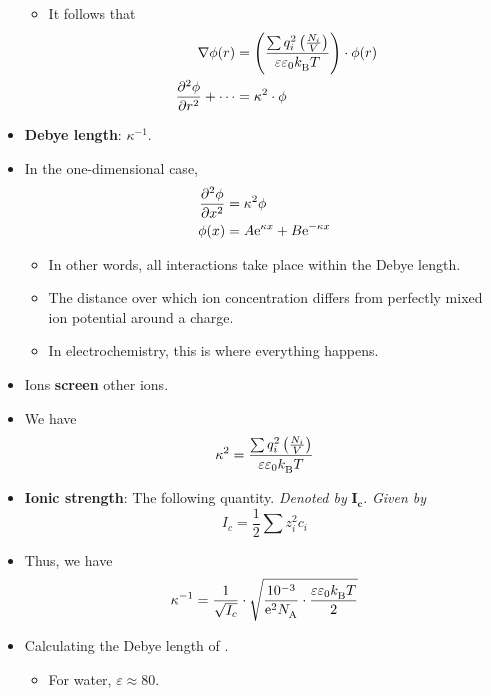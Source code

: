 \documentclass[../notes.tex]{subfiles}
\begin{document}
\begin{itemize}
\begin{itemize}
        \item It follows that
        \begin{align*}
            \nabla\phi(r) &= \left( \frac{\sum q_i^2\left( \frac{N_i}{V} \right)}{\varepsilon\varepsilon_0\kB T} \right)\cdot\phi(r)\\
            \pdv[2]{\phi}{r}+\cdots &= \kappa^2\cdot\phi
        \end{align*}
    \end{itemize}
    \item \textbf{Debye length}: $\kappa^{-1}$.
    \item In the one-dimensional case,
    \begin{align*}
        \pdv[2]{\phi}{x} &= \kappa^2\phi\\
        \phi(x) &= A\e[\kappa x]+B\e[-\kappa x]
    \end{align*}
    \begin{itemize}
        \item In other words, all interactions take place within the Debye length.
        \item The distance over which ion concentration differs from perfectly mixed ion potential around a charge.
        \item In electrochemistry, this is where everything happens.
    \end{itemize}
    \item Ions \textbf{screen} other ions.
    \item We have
    \begin{equation*}
        \kappa^2 = \frac{\sum q_i^2\left( \frac{N_i}{V} \right)}{\varepsilon\varepsilon_0\kB T}
    \end{equation*}
    \item \textbf{Ionic strength}: The following quantity. \emph{Denoted by} $\bm{I_c}$. \emph{Given by}
    \begin{equation*}
        I_c = \frac{1}{2}\sum z_i^2c_i
    \end{equation*}
    \item Thus, we have
    \begin{equation*}
        \kappa^{-1} = \frac{1}{\sqrt{I_c}}\cdot\sqrt{\frac{10^{-3}}{\e[2]\NA}\cdot\frac{\varepsilon\varepsilon_0\kB T}{2}}
    \end{equation*}
    \item Calculating the Debye length of .
    \begin{itemize}
        \item For water, $\varepsilon\approx 80$.

\end{itemize}
\end{itemize}
\end{document}
